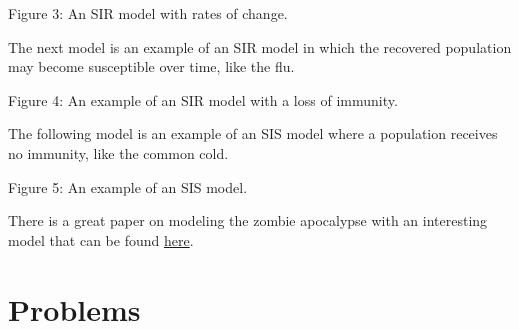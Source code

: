\documentclass{ximera}
\begin{document}
\begin{center}
\end{center}
\begin{center}
    Figure 3: An SIR model with rates of change.
\end{center}

The next model is an example of an SIR model in which the recovered
population may become susceptible over time, like the flu.

\begin{center}
\end{center}
\begin{center}
    Figure 4: An example of an SIR model with a loss of immunity.
\end{center}

The following model is an example of an SIS model where a population
receives no immunity, like the common cold.

\begin{center}
\end{center}
\begin{center}
    Figure 5: An example of an SIS model.
\end{center}

There is a great paper on modeling the zombie apocalypse with an
interesting model that can be found \href{https://loe.org/images/content/091023/Zombie\%20Publication.pdf}{here}.

\section{Problems}
\end{document}
